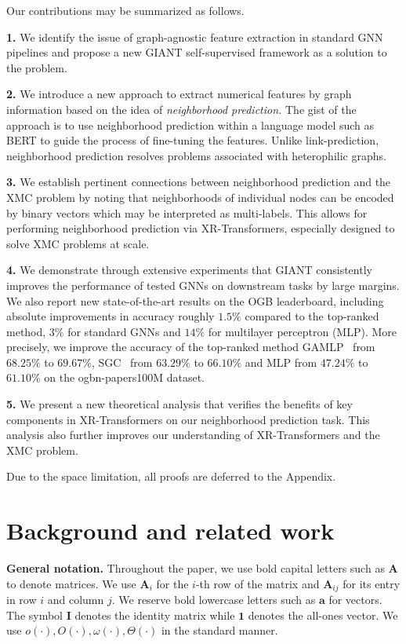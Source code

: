 \documentclass{article} %
\newcommand{\Eli}[1]{{\textcolor{blue}{[Eli: #1]}}}
\begin{document}
Our contributions may be summarized as follows.

\textbf{1.} We identify the issue of graph-agnostic feature extraction in standard GNN pipelines and propose a new GIANT self-supervised framework as a solution to the problem.

\textbf{2.} We introduce a new approach to extract numerical features by graph information based on the idea of \emph{neighborhood prediction.} The gist of the approach is to use neighborhood prediction within a language model such as BERT to guide the process of fine-tuning the features. Unlike link-prediction, neighborhood prediction resolves problems associated with heterophilic graphs.

\textbf{3.} We establish pertinent connections between neighborhood prediction and the XMC problem by noting that neighborhoods of individual nodes can be encoded by binary vectors which may be interpreted as multi-labels. This allows for performing neighborhood prediction via XR-Transformers, especially designed to solve XMC problems at scale.

\textbf{4.} We demonstrate through extensive experiments that GIANT consistently improves the performance of tested GNNs on downstream tasks by large margins. We also report new state-of-the-art results on the OGB leaderboard, including absolute improvements in accuracy roughly $1.5\%$ compared to the top-ranked method, $3\%$ for standard GNNs and $14\%$ for multilayer perceptron (MLP). More precisely, we improve the accuracy of the top-ranked method GAMLP~\citep{zhang2021graph} from $68.25\%$ to $69.67\%$, SGC~\citep{wu2019simplifying} from $63.29\%$ to $66.10\%$ and MLP from $47.24\%$ to $61.10\%$ on the ogbn-papers100M dataset. %

\textbf{5.} We present a new theoretical analysis that verifies the benefits of key components in XR-Transformers on our neighborhood prediction task. This analysis also further improves our understanding of XR-Transformers and the XMC problem.

Due to the space limitation, all proofs are deferred to the Appendix.

\vspace{-0.3cm}
\section{Background and related work}
\textbf{General notation. }Throughout the paper, we use bold capital letters such as $\mathbf{A}$ to denote matrices. We use $\mathbf{A}_i$ for the $i$-th row of the matrix and $\mathbf{A}_{ij}$ for its entry in row $i$ and column $j$. We reserve bold lowercase letters such as $\mathbf{a}$ for vectors. The symbol $\mathbf{I}$ denotes the identity matrix while $\mathbf{1}$ denotes the all-ones vector. We use $o(\cdot), O(\cdot), \omega(\cdot), \Theta(\cdot)$ in the standard manner.
\end{document}
